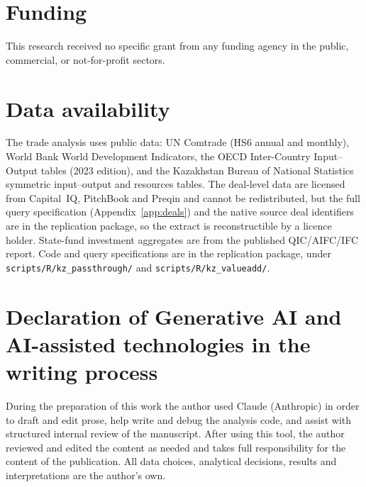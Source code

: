 \documentclass[12pt]{article}
\begin{document}
\section*{Funding}
This research received no specific grant from any funding agency in the public, commercial, or
not-for-profit sectors.

\section*{Data availability}
The trade analysis uses public data: UN Comtrade (HS6 annual and monthly), World Bank World
Development Indicators, the OECD Inter-Country Input--Output tables (2023 edition), and the
Kazakhstan Bureau of National Statistics symmetric input--output and resources tables. The
deal-level data are licensed from Capital~IQ, PitchBook and Preqin and cannot be
redistributed, but the full query specification (Appendix~\ref{app:deals}) and the native
source deal identifiers are in the replication package, so the extract is reconstructible by a
licence holder. State-fund investment aggregates are from the published QIC/AIFC/IFC report.
Code and query specifications are in the replication package, under
\texttt{scripts/R/}\allowbreak\texttt{kz\_passthrough/} and
\texttt{scripts/R/}\allowbreak\texttt{kz\_valueadd/}.

\section*{Declaration of Generative AI and AI-assisted technologies in the writing process}
During the preparation of this work the author used Claude (Anthropic) in order to draft and
edit prose, help write and debug the analysis code, and assist with structured internal review
of the manuscript. After using this tool, the author reviewed and edited the content as needed
and takes full responsibility for the content of the publication. All data choices, analytical
decisions, results and interpretations are the author's own.




\end{document}
